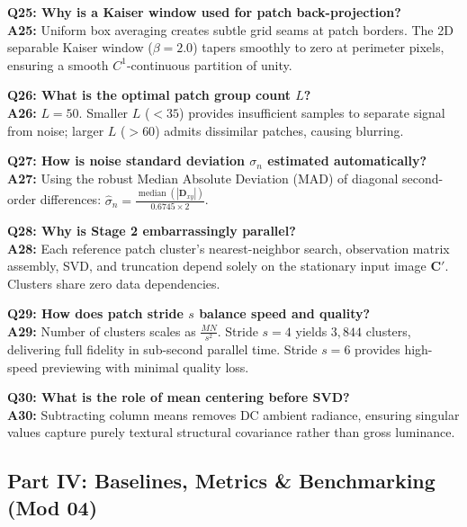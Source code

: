 \documentclass[10pt,conference]{IEEEtran}
\begin{document}
\vspace{0.4em}\noindent\textbf{Q25: Why is a Kaiser window used for patch back-projection?}\\
\textbf{A25:} Uniform box averaging creates subtle grid seams at patch borders. The 2D separable Kaiser window ($\beta = 2.0$) tapers smoothly to zero at perimeter pixels, ensuring a smooth $C^1$-continuous partition of unity.

\vspace{0.4em}\noindent\textbf{Q26: What is the optimal patch group count $L$?}\\
\textbf{A26:} $L = 50$. Smaller $L$ ($< 35$) provides insufficient samples to separate signal from noise; larger $L$ ($> 60$) admits dissimilar patches, causing blurring.

\vspace{0.4em}\noindent\textbf{Q27: How is noise standard deviation $\sigma_n$ estimated automatically?}\\
\textbf{A27:} Using the robust Median Absolute Deviation (MAD) of diagonal second-order differences: $\hat{\sigma}_n = \frac{\operatorname{median}(|\mathbf{D}_{xy}|)}{0.6745 \times 2}$.

\vspace{0.4em}\noindent\textbf{Q28: Why is Stage 2 embarrassingly parallel?}\\
\textbf{A28:} Each reference patch cluster's nearest-neighbor search, observation matrix assembly, SVD, and truncation depend solely on the stationary input image $\mathbf{C}'$. Clusters share zero data dependencies.

\vspace{0.4em}\noindent\textbf{Q29: How does patch stride $s$ balance speed and quality?}\\
\textbf{A29:} Number of clusters scales as $\frac{MN}{s^2}$. Stride $s = 4$ yields $3,844$ clusters, delivering full fidelity in sub-second parallel time. Stride $s = 6$ provides high-speed previewing with minimal quality loss.

\vspace{0.4em}\noindent\textbf{Q30: What is the role of mean centering before SVD?}\\
\textbf{A30:} Subtracting column means removes DC ambient radiance, ensuring singular values capture purely textural structural covariance rather than gross luminance.

\subsection{Part IV: Baselines, Metrics \& Benchmarking (Mod 04)}
\end{document}
